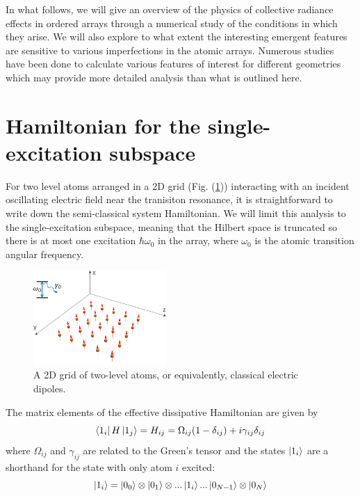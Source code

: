 In what follows, we will give an overview of the physics of collective radiance effects in ordered arrays through a numerical study of the conditions in which they arise. We will also explore to what extent the interesting emergent features are sensitive to various imperfections in the atomic arrays. Numerous studies have been done to calculate various features of interest for different geometries \cite{moreno2019subradiance, ballantine2020subradiance, bettles2016enhanced} which may provide more detailed analysis than what is outlined here.

\section{Hamiltonian for the single-excitation subspace}

For two level atoms arranged in a 2D grid (Fig. (\ref{fig:2datomgrid})) interacting with an incident oscillating electric field near the tranisiton resonance, it is straightforward to write down the semi-classical system Hamiltonian. We will limit this analysis to the single-excitation subspace, meaning that the Hilbert space is truncated so there is at most one excitation $\hbar \omega_0$ in the array, where $\omega_0$ is the atomic transition angular frequency. 

\begin{figure}[!ht]
    \centering
    \includegraphics[width=0.45\textwidth]{Images/atomgrid.pdf}
    \caption{A 2D grid of two-level atoms, or equivalently, classical electric dipoles.}
    \label{fig:2datomgrid}
\end{figure}

The matrix elements of the effective dissipative Hamiltonian are given by
\begin{equation}\label{eq:greenham}
    \bra{1_i} H \ket{1_j} = H_{ij} = \Omega_{ij}(1 - \delta_{ij}) + i\gamma_{ij}\delta_{ij}
\end{equation}
where $\Omega_{ij}$ and $\gamma_{ij}$ are related to the Green's tensor and the states $\ket{1_i}$ are a shorthand for the state with only atom $i$ excited: 
\begin{equation}
    \ket{1_i} = \ket{0_0} \otimes \ket{0_1} \otimes ... \ket{1_i} ... \ket{0_{N-1}} \otimes \ket{0_N}
\end{equation}

